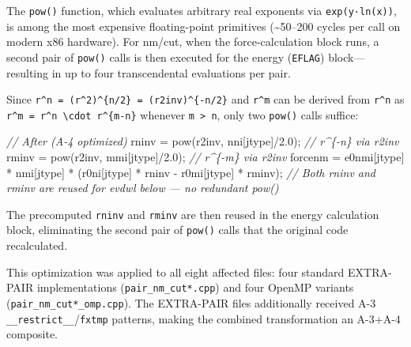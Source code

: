\documentclass[
  11pt,
]{article}
\newenvironment{Shaded}{}{}
\newcommand{\CommentTok}[1]{\textcolor[rgb]{0.38,0.63,0.69}{\textit{#1}}}
\newcommand{\FloatTok}[1]{\textcolor[rgb]{0.25,0.63,0.44}{#1}}
\newcommand{\NormalTok}[1]{#1}
\newcommand{\OperatorTok}[1]{\textcolor[rgb]{0.40,0.40,0.40}{#1}}
\begin{document}
The \texttt{pow()} function, which evaluates arbitrary real exponents
via \texttt{exp(y·ln(x))}, is among the most expensive floating-point
primitives (\textasciitilde50--200 cycles per call on modern x86
hardware). For nm/cut, when the force-calculation block runs, a second
pair of \texttt{pow()} calls is then executed for the energy
(\texttt{EFLAG}) block---resulting in up to four transcendental
evaluations per pair.

Since \texttt{r\^{}n\ =\ (r\^{}2)\^{}\{n/2\}\ =\ (r2inv)\^{}\{-n/2\}}
and \texttt{r\^{}m} can be derived from \texttt{r\^{}n} as
\texttt{r\^{}m\ =\ r\^{}n\ \textbackslash{}cdot\ r\^{}\{m-n\}} whenever
\texttt{m\ \textgreater{}\ n}, only two \texttt{pow()} calls suffice:

\begin{Shaded}
\begin{Highlighting}[]
\CommentTok{// After (A{-}4 optimized)}
\NormalTok{rninv }\OperatorTok{=}\NormalTok{ pow}\OperatorTok{(}\NormalTok{r2inv}\OperatorTok{,}\NormalTok{ nni}\OperatorTok{[}\NormalTok{jtype}\OperatorTok{]/}\FloatTok{2.0}\OperatorTok{);}   \CommentTok{// r\^{}\{{-}n\} via r2inv}
\NormalTok{rminv }\OperatorTok{=}\NormalTok{ pow}\OperatorTok{(}\NormalTok{r2inv}\OperatorTok{,}\NormalTok{ mmi}\OperatorTok{[}\NormalTok{jtype}\OperatorTok{]/}\FloatTok{2.0}\OperatorTok{);}   \CommentTok{// r\^{}\{{-}m\} via r2inv}
\NormalTok{forcenm }\OperatorTok{=}\NormalTok{ e0nmi}\OperatorTok{[}\NormalTok{jtype}\OperatorTok{]} \OperatorTok{*}\NormalTok{ nmi}\OperatorTok{[}\NormalTok{jtype}\OperatorTok{]} \OperatorTok{*}
          \OperatorTok{(}\NormalTok{r0ni}\OperatorTok{[}\NormalTok{jtype}\OperatorTok{]} \OperatorTok{*}\NormalTok{ rninv }\OperatorTok{{-}}\NormalTok{ r0mi}\OperatorTok{[}\NormalTok{jtype}\OperatorTok{]} \OperatorTok{*}\NormalTok{ rminv}\OperatorTok{);}
\CommentTok{// Both rninv and rminv are reused for evdwl below — no redundant pow()}
\end{Highlighting}
\end{Shaded}

The precomputed \texttt{rninv} and \texttt{rminv} are then reused in the
energy calculation block, eliminating the second pair of \texttt{pow()}
calls that the original code recalculated.

This optimization was applied to all eight affected files: four standard
EXTRA-PAIR implementations (\texttt{pair\_nm\_cut*.cpp}) and four OpenMP
variants (\texttt{pair\_nm\_cut*\_omp.cpp}). The EXTRA-PAIR files
additionally received A-3 \texttt{\_\_restrict\_\_}/\texttt{fxtmp}
patterns, making the combined transformation an A-3+A-4 composite.
\end{document}
